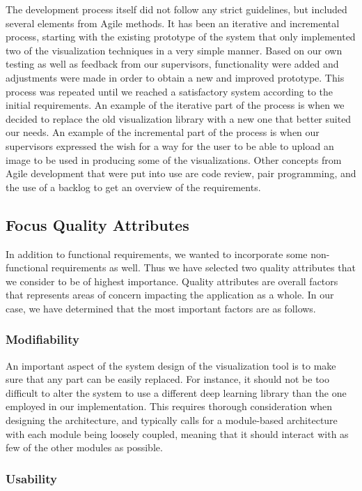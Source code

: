 \noindent The development process itself did not follow any strict guidelines, but included several elements from Agile methods. It has been an iterative and incremental process, starting with the existing prototype of the system that only implemented two of the visualization techniques in a very simple manner. Based on our own testing as well as feedback from our supervisors, functionality were added and adjustments were made in order to obtain a new and improved prototype. This process was repeated until we reached a satisfactory system according to the initial requirements. An example of the iterative part of the process is when we decided to replace the old visualization library with a new one that better suited our needs. An example of the incremental part of the process is when our supervisors expressed the wish for a way for the user to be able to upload an image to be used in producing some of the visualizations. Other concepts from Agile development that were put into use are code review, pair programming, and the use of a backlog to get an overview of the requirements.

\subsection{Focus Quality Attributes}

In addition to functional requirements, we wanted to incorporate some non-functional requirements as well. Thus we have selected two quality attributes that we consider to be of highest importance. Quality attributes are overall factors that represents areas of concern impacting the application as a whole. In our case, we have determined that the most important factors are as follows.

\subsubsection{Modifiability}

An important aspect of the system design of the visualization tool is to make sure that any part can be easily replaced. For instance, it should not be too difficult to alter the system to use a different deep learning library than the one employed in our implementation. This requires thorough consideration when designing the architecture, and typically calls for a module-based architecture with each module being loosely coupled, meaning that it should interact with as few of the other modules as possible.

\subsubsection{Usability}

